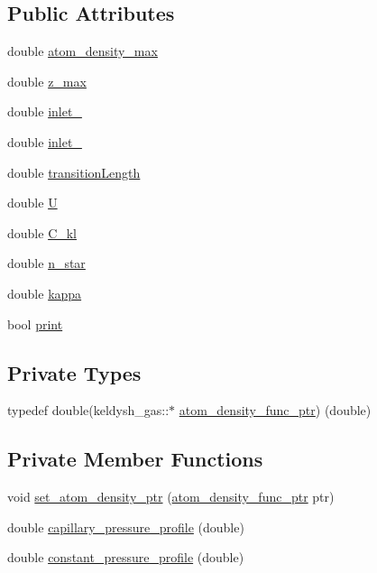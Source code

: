 \subsection*{Public Attributes}
\begin{DoxyCompactItemize}
\item 
double \mbox{\hyperlink{classkeldysh__gas_a287e2c7a3081d8b65ba126288a3174bd}{atom\+\_\+density\+\_\+max}}
\item 
double \mbox{\hyperlink{classkeldysh__gas_a117691dd8b6fd06b34a73392c0e73e32}{z\+\_\+max}}
\item 
double \mbox{\hyperlink{classkeldysh__gas_ab0dee35b9ad45af3fca4a2079389e632}{inlet\+\_}}
\item 
double \mbox{\hyperlink{classkeldysh__gas_a685d93a796afba55c6fcd6d61c7e2bf8}{inlet\+\_}}
\item 
double \mbox{\hyperlink{classkeldysh__gas_a88f63ff18217c60729a67b10ee838ee4}{transition\+Length}}
\item 
double \mbox{\hyperlink{classkeldysh__gas_a752b70afe289a798cc0ab7b688b9ed3d}{U}}
\item 
double \mbox{\hyperlink{classkeldysh__gas_a7a66e438ff78b240fe419c0a426b1648}{C\+\_\+kl}}
\item 
double \mbox{\hyperlink{classkeldysh__gas_a22ba35c494b37c8a8e78db09d6d8748c}{n\+\_\+star}}
\item 
double \mbox{\hyperlink{classkeldysh__gas_a836c6a6c2f1bec80ea15344822a07ea5}{kappa}}
\item 
bool \mbox{\hyperlink{classkeldysh__gas_a6c8f0e275da16bbf21f51a8c2a444bf7}{print}}
\end{DoxyCompactItemize}
\subsection*{Private Types}
\begin{DoxyCompactItemize}
\item 
typedef double(keldysh\+\_\+gas\+::$\ast$ \mbox{\hyperlink{classkeldysh__gas_ab47ad59b466eee349a7500555869b988}{atom\+\_\+density\+\_\+func\+\_\+ptr}}) (double)
\end{DoxyCompactItemize}
\subsection*{Private Member Functions}
\begin{DoxyCompactItemize}
\item 
void \mbox{\hyperlink{classkeldysh__gas_a051c59204ad55298d5632ac2eb4dd626}{set\+\_\+atom\+\_\+density\+\_\+ptr}} (\mbox{\hyperlink{classkeldysh__gas_ab47ad59b466eee349a7500555869b988}{atom\+\_\+density\+\_\+func\+\_\+ptr}} ptr)
\item 
double \mbox{\hyperlink{classkeldysh__gas_a9eac2e3d9a39a2358e9b6eb7f4a868c6}{capillary\+\_\+pressure\+\_\+profile}} (double)
\item 
double \mbox{\hyperlink{classkeldysh__gas_ad70cb5ac156d96492a164774b80e7cdc}{constant\+\_\+pressure\+\_\+profile}} (double)
\end{DoxyCompactItemize}

